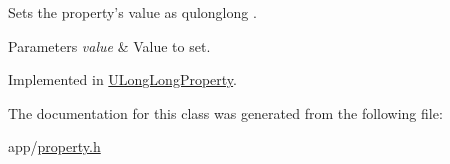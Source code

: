Sets the property's value as qulonglong . 


\begin{DoxyParams}{Parameters}
{\em value} & Value to set. \\
\hline
\end{DoxyParams}


Implemented in \hyperlink{class_u_long_long_property_abb1dcbdd5327e7cd261df653dadcc2c9}{U\-Long\-Long\-Property}.



The documentation for this class was generated from the following file\-:\begin{DoxyCompactItemize}
\item 
app/\hyperlink{property_8h}{property.\-h}\end{DoxyCompactItemize}
